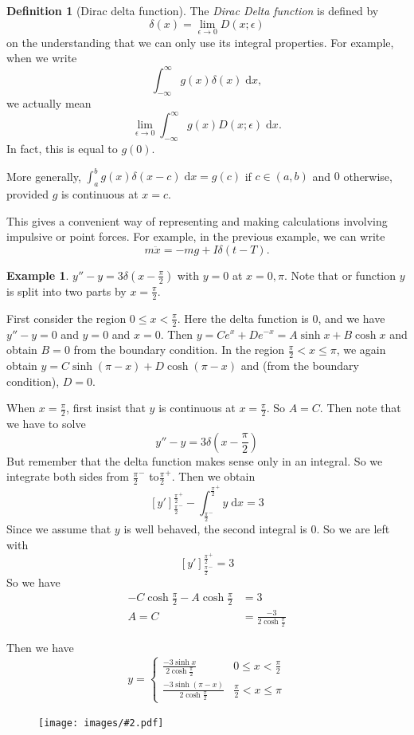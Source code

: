 \documentclass[a4paper]{article}
\theoremstyle{definition}
\newtheorem*{defi}{Definition}
\newtheorem*{eg}{Example}
\renewcommand{\d}{\mathrm{d}}
\newcommand{\img}[2][]{\begin{figure}[ht]\centering\texttt{[image: images/\#2.pdf]}\end{figure}}
\begin{document}
\begin{defi}[Dirac delta function]
  The \emph{Dirac Delta function} is defined by 
  \[
  \delta(x) = \lim_{\epsilon \to 0} D(x; \epsilon)
  \]
  on the understanding that we can only use its integral properties. For example, when we write
  \[
  \int_{-\infty}^{\infty} g(x)\delta (x) \;\d x,
  \]
  we actually mean
  \[
  \lim_{\epsilon \to 0} \int_{-\infty}^{\infty} g(x)D(x; \epsilon)\;\d x.
  \]
  In fact, this is equal to $g(0)$. 

  More generally, $\int_a^b g(x)\delta(x - c)\;\d x = g(c)$ if $c\in (a, b)$ and $0$ otherwise, provided $g$ is continuous at $x = c$.
\end{defi}

This gives a convenient way of representing and making calculations involving impulsive or point forces. For example, in the previous example, we can write
\[
m\ddot x = -mg + I\delta(t - T).
\]

\begin{eg}
  $y'' - y = 3\delta(x - \frac{\pi}{2})$ with $y = 0$ at $x = 0, \pi$. Note that or function $y$ is split into two parts by $x = \frac{\pi}{2}$.

First consider the region $0 \leq x < \frac{\pi}{2}$. Here the delta function is $0$, and we have $y'' - y = 0$ and $y = 0$ and $x = 0$. Then $y = Ce^x + De^{-x} = A\sinh x + B\cosh x$ and obtain $B = 0$ from the boundary condition. 
In the region $\frac{\pi}{2} < x \leq \pi$, we again obtain $y = C\sinh(\pi - x) + D\cosh (\pi - x)$ and (from the boundary condition), $D = 0$.

When $x = \frac{\pi}{2}$, first insist that $y$ is continuous at $x = \frac{\pi}{2}$. So $A = C$. Then note that we have to solve 
\[
y'' - y = 3\delta\left(x - \frac{\pi}{2}\right)
\]
But remember that the delta function makes sense only in an integral. So we integrate both sides from $\frac{\pi}{2}^-$ to$\frac{\pi}{2}^+$. Then we obtain
\[
[y']^{\frac{\pi}{2}^+}_{\frac{\pi}{2}^-} - \int_{\frac{\pi}{2}^-}^{\frac{\pi}{2}^+} y\;\d x= 3
\]
Since we assume that $y$ is well behaved, the second integral is 0. So we are left with 
\[
[y']^{\frac{\pi}{2}^+}_{\frac{\pi}{2}^-} = 3
\]
So we have 
\begin{align*}
  -C\cosh \frac{\pi}{2} - A\cosh\frac{\pi}{2} &= 3\\
  A = C &= \frac{-3}{2\cosh \frac{\pi}{2}}
\end{align*}
\end{eg}

Then we have 
\[
y =
\begin{cases}
  \frac{-3\sinh x}{2\cosh \frac{\pi}{2}} & 0 \leq x < \frac{\pi}{2}\\
  \frac{-3\sinh(\pi - x)}{2\cosh \frac{\pi}{2}} & \frac{\pi}{2} < x \leq \pi
\end{cases}
\]
\img[width=250pt]{de_20}
\end{document}
